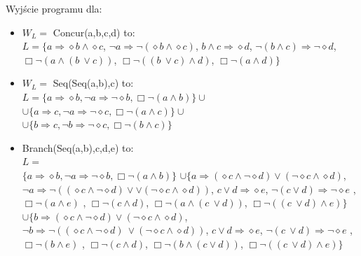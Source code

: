 \documentclass[a4paper, 11pt]{article}
\begin{document}
	Wyjście programu dla:
	\begin{itemize}
	\item $W_L= $ Concur(a,b,c,d) to:\\
	$L= \{ a   \Rightarrow     \diamond b   \wedge    \diamond c $,
		$	  \neg a   \Rightarrow     \neg (  \diamond b   \wedge    \diamond c)$,
			$ b   \wedge   c    \Rightarrow    \diamond d$,
			$  \neg (b   \wedge   c)    \Rightarrow     \neg   \diamond d$,
			$  \Box   \neg (a   \wedge   (b \  \vee   c))$,
			$  \Box   \neg ((b \  \vee   c)   \wedge   d)$,
			$  \Box   \neg (a   \wedge   d)\}$
	
	\item 	$W_L=$ Seq(Seq(a,b),c) to: \\
	$ L=\{  a \Rightarrow \diamond b , \neg a\Rightarrow \neg \diamond b, \Box \neg (a \wedge  b)\} \cup $ \\
	$ \cup \{ a \Rightarrow c , \neg a\Rightarrow \neg \diamond c, \Box\neg (a \wedge  c)\} \cup $\\
	$ \cup \{ b \Rightarrow c , \neg b\Rightarrow \neg \diamond c, \Box \neg (b \wedge  c)\} $
	
	\item Branch(Seq(a,b),c,d,e) to:\\
	$ L=$\\$ \{  a \Rightarrow \diamond b , \neg a\Rightarrow \neg \diamond b, \Box \neg (a \wedge  b)\} $ 
	$\cup 	\{	  a    \Rightarrow    ( \diamond c   \wedge    \neg   \diamond d)   \vee   ( \neg   \diamond c   \wedge    \diamond d)$,
			  $ \neg a    \Rightarrow     \neg (( \diamond c   \wedge    \neg   \diamond d)  \vee  \vee ( \neg   \diamond c   \wedge    \diamond d))$,
			 $ c  \vee d    \Rightarrow     \diamond e $,
			  $ \neg (c  \vee   d)    \Rightarrow    \neg   \diamond e$ ,
			   $\Box   \neg (a   \wedge   e)$ ,
			   $\Box   \neg (c   \wedge   d)$,
			   $\Box   \neg (a   \wedge   (c \  \vee   d))$,
			   $\Box   \neg ((c \  \vee   d)   \wedge   e)\} $			  
	$\cup 	\{	  b    \Rightarrow    ( \diamond c   \wedge    \neg   \diamond d)   \vee   ( \neg   \diamond c   \wedge    \diamond d)$,
			  $ \neg b    \Rightarrow     \neg (( \diamond c   \wedge    \neg   \diamond d) \  \vee   ( \neg   \diamond c   \wedge    \diamond d))$,
			 $ c  \vee   d    \Rightarrow     \diamond e $,
			  $ \neg (c \  \vee   d)    \Rightarrow    \neg   \diamond e$ ,
			   $\Box   \neg (b   \wedge   e)$ ,
			   $\Box   \neg (c   \wedge   d)$,
			   $\Box   \neg (b   \wedge   (c   \vee   d))$,
			   $\Box   \neg ((c \  \vee   d)   \wedge   e)\}$
			 		   		
	\end{itemize}
\end{document}
